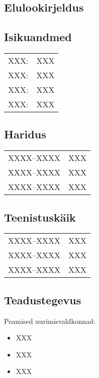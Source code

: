 \begin{otherlanguage}{estonian}
\chapter*{Elulookirjeldus}

\section*{Isikuandmed}

\begin{tabular}{@{}l@{\hskip7mm}l}
XXX:       &XXX\\
XXX:       &XXX\\
XXX:       &XXX\\
XXX:       &XXX
\end{tabular}

\section*{Haridus}

\begin{tabular}{@{}l@{\hskip7mm}p{90mm}}
XXXX--XXXX         & XXX\\
XXXX--XXXX         & XXX\\
XXXX--XXXX         & XXX
\end{tabular}

\section*{Teenistusk\"aik}

\begin{tabular}{@{}l@{\hskip7mm}p{90mm}}
XXXX--XXXX         & XXX\\
XXXX--XXXX         & XXX\\
XXXX--XXXX         & XXX
\end{tabular}

\section*{Teadustegevus}

Peamised uurimisvaldkonnad:
\begin{itemize}
  \item XXX
  \item XXX
  \item XXX
\end{itemize}
\end{otherlanguage}

